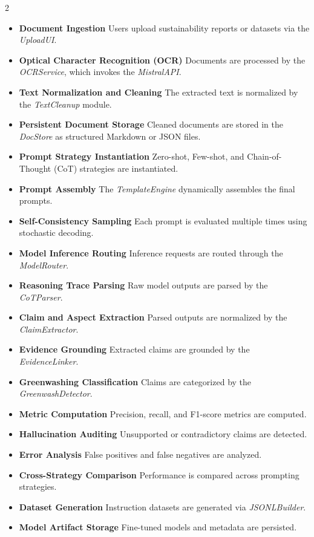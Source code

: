\documentclass{article}
\begin{document}
\begin{paracol}{2}
\small
\setlength{\itemsep}{1pt}
\setlength{\parskip}{0pt}
\raggedright

\begin{itemize}
\item \textbf{Document Ingestion} Users upload sustainability reports or datasets via the \textit{UploadUI}.
\item \textbf{Optical Character Recognition (OCR)} Documents are processed by the \textit{OCRService}, which invokes the \textit{MistralAPI}.
\item \textbf{Text Normalization and Cleaning} The extracted text is normalized by the \textit{TextCleanup} module.
\item \textbf{Persistent Document Storage} Cleaned documents are stored in the \textit{DocStore} as structured Markdown or JSON files.
\item \textbf{Prompt Strategy Instantiation} Zero-shot, Few-shot, and Chain-of-Thought (CoT) strategies are instantiated.
\item \textbf{Prompt Assembly} The \textit{TemplateEngine} dynamically assembles the final prompts.
\item \textbf{Self-Consistency Sampling} Each prompt is evaluated multiple times using stochastic decoding.
\item \textbf{Model Inference Routing} Inference requests are routed through the \textit{ModelRouter}.
\item \textbf{Reasoning Trace Parsing} Raw model outputs are parsed by the \textit{CoTParser}.
\item \textbf{Claim and Aspect Extraction} Parsed outputs are normalized by the \textit{ClaimExtractor}.
\item \textbf{Evidence Grounding} Extracted claims are grounded by the \textit{EvidenceLinker}.
\item \textbf{Greenwashing Classification} Claims are categorized by the \textit{GreenwashDetector}.
\item \textbf{Metric Computation} Precision, recall, and F1-score metrics are computed.
\item \textbf{Hallucination Auditing} Unsupported or contradictory claims are detected.
\item \textbf{Error Analysis} False positives and false negatives are analyzed.
\item \textbf{Cross-Strategy Comparison} Performance is compared across prompting strategies.
\item \textbf{Dataset Generation} Instruction datasets are generated via \textit{JSONLBuilder}.
\item \textbf{Model Artifact Storage} Fine-tuned models and metadata are persisted.
\end{itemize}


\end{paracol}
\end{document}
